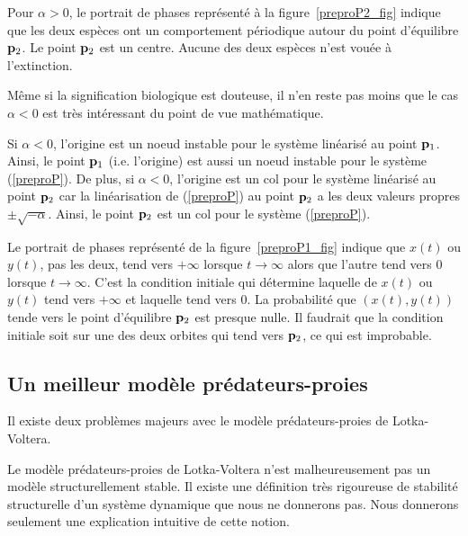 {Pour $\alpha>0$, le portrait de phases représenté à la
figure~\ref{preproP2_fig} indique que les deux espèces ont un
comportement périodique autour du point d'équilibre $\mathbf{p}_2$.  Le
point $\mathbf{p}_2$ est un centre. Aucune des deux espèces n'est vouée à
l'extinction.


\begin{rmk}
Même si la signification biologique est douteuse, il n'en reste pas moins que
le cas $\alpha <0$ est très intéressant du point de vue mathématique.

Si $\alpha <0$, l'origine est un noeud instable pour le système linéarisé au
point $\mathbf{p}_1$.  Ainsi, le point $\mathbf{p}_1$ (i.e. l'origine) est aussi un
noeud instable pour le système (\ref{preproP}).  De plus, si $\alpha <0$,
l'origine est un col pour le système linéarisé au point $\mathbf{p}_2$ car
la linéarisation de (\ref{preproP}) au point $\mathbf{p}_2$ a les deux
valeurs propres $\pm \sqrt{-\alpha}$.  Ainsi, le point $\mathbf{p}_2$ est un col
pour le système (\ref{preproP}).

Le portrait de phases représenté de la figure~\ref{preproP1_fig} indique que
$x(t)$ ou $y(t)$, pas les deux, tend vers $+\infty$ lorsque
$t \to \infty$ alors que l'autre tend vers $0$ lorsque $t \to \infty$.
C'est la condition initiale qui détermine laquelle de $x(t)$ ou $y(t)$
tend vers $+\infty$ et laquelle tend vers $0$.  La probabilité que
$(x(t),y(t))$ tende vers le point d'équilibre $\mathbf{p}_2$ est presque
nulle.  Il faudrait que la condition initiale soit sur une des deux
orbites qui tend vers $\mathbf{p}_2$, ce qui est improbable.
\end{rmk}


\subsection{Un meilleur modèle prédateurs-proies}

Il existe deux problèmes majeurs avec le modèle prédateurs-proies de
Lotka-Voltera.

Le modèle prédateurs-proies de Lotka-Voltera n'est malheureusement pas
un modèle \flqq structurellement stable\frqq.  Il existe une
définition très rigoureuse de stabilité structurelle d'un système
dynamique que nous ne donnerons pas.  Nous donnerons seulement une
explication intuitive de cette notion.

}
